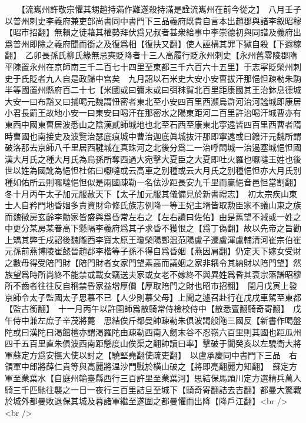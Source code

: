 　　【流嶲州許敬宗懼其甥趙持滿作難遂殺持滿是詮流嶲州在前今從之】　八月壬子以普州刺史李義府兼吏部尚書同中書門下三品義府既貴自言本出趙郡與諸李叙昭穆【昭市招翻】無賴之徒藉其權勢拜伏爲兄叔者甚衆給事中李崇德初與同譜及義府出爲普州即除之義府聞而銜之及復爲相【復扶又翻】使人誣構其罪下獄自殺【下遐稼翻】　乙卯長孫氏柳氏緣無忌奭貶降者十三人高履行貶永州刺史【永州舊零陵郡隋平陳置永州在京師南三千二百七十四里至東都三千六百六十五里】于志寜貶榮州刺史于氏貶者九人自是政歸中宫矣　九月詔以石米史大安小安曹拔汗那悒怛疎勒朱駒半等國置州縣府百二十七【米國或曰彌末或曰弭秣賀北百里距康國其王治鉢息德城大安一曰布豁又曰捕喝元魏謂忸密者東北至小安四百里西瀕烏滸河治河謐城即康居小君長罽王故地小安一曰東安曰喝汗在那密水之陽東距河二百里許治喝汗城曹亦有東西中國東曹居波悉山之陰漢貳師城地也北至石西至康東北寜遠皆四百里西曹者隋時曹國也南接史及波覽治瑟底痕城中曹治迦底眞城抜汗那即寧遠或曰鏺汗元魏所謂破洛那去京師八千里居西鞬城在真珠河之北後分爲二一治呼悶城一治遏塞城悒怛國漢大月氏之種大月氏為烏孫所奪西過大宛擊大夏臣之大夏即吐火羅也嚈噠王姓也後世以姓為國訛為悒怛杜佑曰嚈噠或云高車之别種或云大月氏之别種悒怛亦大月氏别種如佑所云則嚈噠悒怛似是兩國疎勒一名佉沙距長安九千里而贏悒音邑怛當割翻】　冬十月丙午太子加元服赦天下【太子加元服其儀備見於新書禮志】　初太宗疾山東士人自矜門地昏姻多責資財命修氏族志例降一等王妃主壻皆取勲臣家不議山東之族而魏徵房玄齡李勣家皆盛與爲昏常左右之【左右讀曰佐佑】由是舊望不減或一姓之中更分某房某眷高下懸隔李義府爲其子求昏不獲恨之【爲丁偽翻】故以先帝之旨勸上矯其弊壬戌詔後魏隴西李寶太原王瓊榮陽鄭温范陽盧子遷盧渾盧輔清河崔宗伯崔元孫前燕博陵崔懿晉趙郡李楷等子孫不得自爲昏姻【燕因肩翻】仍定天下嫁女受財之數毋得受陪門財【陪門財者女家門望素高而議姻之家非耦令其納財以陪門望】然族望爲時所尚終不能禁或載女竊送夫家或女老不嫁終不與異姓爲昏其衰宗落譜昭穆所不齒者往往反自稱禁昏家益增厚價【厚取陪門之財也昭市招翻】　閏月戊寅上發京師令太子監國太子思慕不已【人少則慕父母】上聞之遽召赴行在戊戌車駕至東都【監古銜翻】　十一月丙午以許圉師爲散騎常侍檢校侍中【散悉亶翻騎奇寄翻】　戊午侍中兼左庶子辛茂將薨　思結俟斤都曼帥疎勒朱俱波謁般陁三國反【新書作喝盤陀或曰漢陀曰渇館檀亦謂渇羅陀由疎勒西南入劒末谷不忍嶺六百里則其國也距瓜州四千五百里直朱俱波西南距懸度山俟渠之翻帥讀曰率】擊破于闐癸亥以左驍衛大將軍蘇定方爲安撫大使以討之【驍堅堯翻使疏吏翻】　以盧承慶同中書門下三品　右領軍中郎將薛仁貴等與高麗將温沙門戰於横山破之【將即亮翻麗力知翻】　蘇定方軍至業葉水【自庭州輪臺縣西行三百許里至業葉河】思結保馬頭川定方選精兵萬人騎三千匹馳往襲之一日一夜行三百里詰旦至城下【騎奇寄翻詰去吉翻】都曼大驚戰於城外都曼敗退保其城及暮諸軍繼至遂圍之都曼懼而出降【降戶江翻】<br />
<br />
